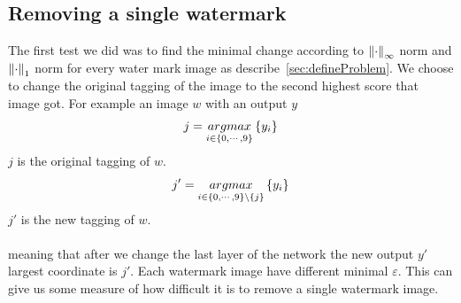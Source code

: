 \documentclass[a4paper]{llncs}
\begin{document}
\subsection{Removing a single watermark}
The first test we did was to find the minimal change according to $\left\lVert\cdot\right\rVert_{\infty}$ norm and $\left\lVert\cdot\right\rVert_1$ norm for every water mark image as describe~\ref{sec:defineProblem}. We choose to change the original tagging of the image to the second highest score that image got. For example an image $w$ with an output $y$ 
$$j=\underset{i\in\left\lbrace 0,\cdots,9\right\rbrace}{argmax}\left\lbrace y_i\right\rbrace$$ 
$j$ is the original tagging of $w$. 
$$j'=\underset{i\in\left\lbrace 0,\cdots,9\right\rbrace\setminus \left\lbrace j\right\rbrace}{argmax}\left\lbrace y_i\right\rbrace$$ 
$j'$ is the new tagging of $w$. \\\\
meaning that after we change the last layer of the network the new output $y'$ largest coordinate is $j'$.   
Each watermark image have different minimal $\varepsilon$. This can give us some measure of how difficult it is to remove a single watermark image.
\end{document}
